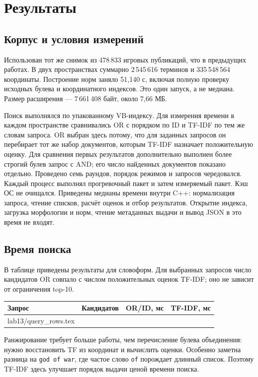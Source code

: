 \documentclass[12pt,a4paper]{article}
\makeatletter
\newcommand{\inputrows}[1]{\@@input #1 }
\makeatother
\begin{document}
\section{Результаты}
\subsection{Корпус и условия измерений}
Использован тот же снимок из 478\,833 игровых публикаций, что в предыдущих
работах. В двух пространствах суммарно 2\,545\,616 терминов и
335\,548\,564 координаты. Построение норм заняло 51,140 с, включая полную
проверку исходных булева и координатного индексов. Это один запуск,
а не медиана. Размер расширения --- 7\,661\,408 байт, около 7,66 МБ.

Поиск выполнялся по упакованному VB-индексу. Для измерения времени в каждом
пространстве сравнивались OR с порядком по ID и TF-IDF по тем же словам
запроса. OR выбран здесь потому, что для заданных запросов он перебирает
тот же набор документов, которым TF-IDF назначает положительную оценку.
Для сравнения первых результатов дополнительно выполнен более строгий
булев запрос с AND; его число найденных документов показано отдельно.
Проведено семь раундов, порядок режимов и запросов чередовался.
Каждый процесс выполнял прогревочный пакет и затем измеряемый пакет.
Кэш ОС не очищался. Приведены медианы времени внутри C++:
нормализация запроса, чтение списков, расчёт оценок и отбор результатов.
Открытие индекса, загрузка морфологии и норм, чтение метаданных выдачи
и вывод JSON в это время не входят.

\subsection{Время поиска}
В таблице приведены результаты для словоформ. Для выбранных запросов
число кандидатов OR совпало с числом положительных оценок TF-IDF;
оно не зависит от ограничения top-10.
\begin{center}
\small
\begin{tabular}{@{}lrrr@{}}
\toprule
Запрос & Кандидатов & OR/ID, мс & TF-IDF, мс\\
\midrule
\inputrows{lab13/query_rows.tex}
\bottomrule
\end{tabular}
\end{center}

Ранжирование требует больше работы, чем перечисление булева объединения:
нужно восстановить TF из координат и вычислить оценки. Особенно заметна
разница на \texttt{god of war}, где частое слово \texttt{of} порождает длинный
список. Поэтому TF-IDF здесь улучшает порядок выдачи ценой времени поиска.
\end{document}
